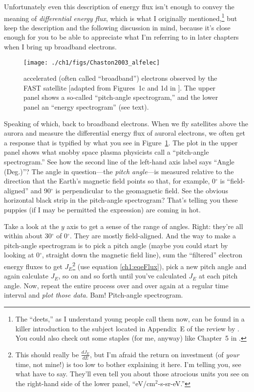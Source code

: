 Unfortunately even this description of energy flux isn't enough to
convey the meaning of \emph{differential energy flux}, which is what I
originally mentioned,\footnote{The ``deets,'' as I understand young
  people call them now, can be found in a killer introduction to the
  subject located in Appendix~E of the review by
  \citet{Bruno2013}. You could also check out some staples (for me,
  anyway) like Chapter~5 in \citet{Paschmann1998}.} but keep the
description and the following discussion in mind, because it's close
enough for you to be able to appreciate what I'm referring to in later
chapters when I bring up broadband electrons.


\begin{figure}
  \centering
  \noindent\texttt{[image: ./ch1/figs/Chaston2003\_alfelec]}
  \caption[\Alfically accelerated (broadband) electrons]{\Alfically
    accelerated (often called ``broadband'') electrons observed by
    the FAST satellite [adapted from Figures~1c and 1d in
    \citealp{Chaston2003a}]. The upper panel shows a so-called
    ``pitch-angle spectrogram,'' and the lower panel an ``energy
    spectrogram'' (see text).}
  \label{ch1:FigAlfElec}
\end{figure}


Speaking of which, back to broadband electrons. When we fly satellites
above the aurora and measure the differential energy flux of auroral
electrons, we often get a response that is typified by what you see in
Figure~\ref{ch1:FigAlfElec}. The plot in the upper panel shows what
snobby space plasma physicists call a ``pitch-angle spectrogram.''
See how the second line of the left-hand axis label says ``Angle
(Deg.)''?  The angle in question---the \emph{pitch angle}---is
measured relative to the direction that the Earth's magnetic field
points so that, for example, 0$^\circ$ is ``field-aligned'' and
90$^\circ$ is perpendicular to the geomagnetic field. See the obvious
horizontal black strip in the pitch-angle spectrogram? That's telling
you these puppies (if I may be permitted the expression) are coming in
hot.

Take a look at the $y$ axis to get a sense of the range of
angles. Right: they're all within about 30$^\circ$ of 0$^\circ$. They
are mostly field-aligned. And the way to make a pitch-angle
spectrogram is to pick a pitch angle (maybe you could start by looking
at 0$^\circ$, straight down the magnetic field line), sum the
``filtered'' electron energy fluxes to get $J_E$\footnote{This should
  really be $\frac{dJ_E}{dE}$, but I'm afraid the return on investment
  (of \emph{your} time, not mine!) is too low to bother explaining it
  here. I'm telling you, see what \citet{Bruno2013} have to
  say. They'll even tell you about those atrocious units you see on
  the right-hand side of the lower panel, ``eV/cm$^2$-s-sr-eV.''} (use
equation \ref{ch1:eqeFlux}), pick a new pitch angle and again
calculate $J_E$, so on and so forth until you've calculated $J_E$ at
each pitch angle. Now, repeat the entire process over and over again
at a regular time interval and \emph{plot those data.} Bam!
Pitch-angle spectrogram.

